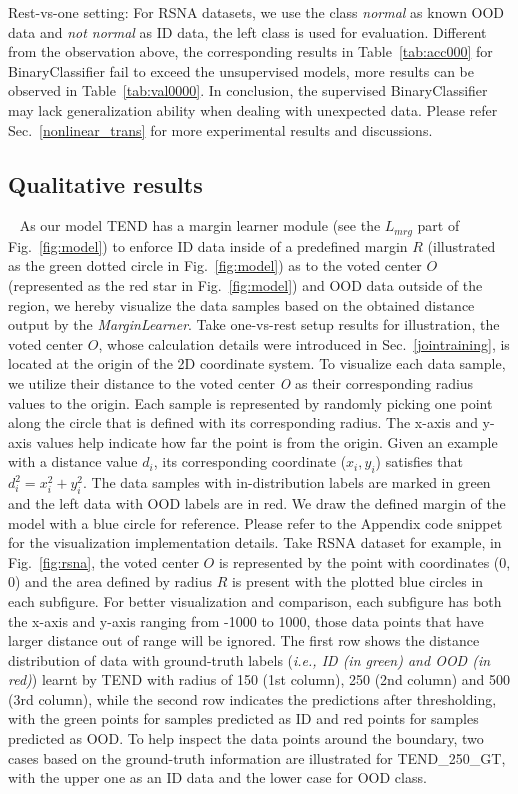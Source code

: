 \documentclass[12pt]{spieman}  %
\begin{document}
\begin{spacing}{2}
Rest-vs-one setting:
For RSNA datasets, we use the class \textit{normal} as known OOD data and \textit{not normal} as ID data, the left class is used for evaluation. Different from the observation above, the corresponding results in Table~\ref{tab:acc000} for BinaryClassifier fail to exceed the unsupervised models, more results can be observed in Table~\ref{tab:val0000}. In conclusion, the supervised BinaryClassifier may lack generalization ability when dealing with unexpected data.
Please refer Sec.~\ref{nonlinear_trans} for more experimental results and discussions.           


\subsection{Qualitative results}~\label{qual}
\noindent As our model TEND has a margin learner module (see the $L_{mrg}$ part of Fig.~\ref{fig:model}) to enforce ID data inside of a predefined margin $R$ (illustrated as the green dotted circle in Fig.~\ref{fig:model}) as to the voted center $O$ (represented as the red star in Fig.~\ref{fig:model}) and OOD data outside of the region, we hereby visualize the data samples based on the obtained distance output by the \textit{MarginLearner}. Take one-vs-rest setup results for illustration, the voted center $O$, whose calculation details were introduced in Sec.~\ref{jointraining}, is located at the origin of the 2D coordinate system. To visualize each data sample, we utilize their distance to the voted center \textit{O} as their corresponding radius values to the origin. Each sample is represented by randomly picking one point along the circle that is defined with its corresponding radius. The x-axis and y-axis values help indicate how far the point is from the origin. Given an example with a distance value $d_{i}$, its corresponding coordinate ($x_{i}, y_{i}$) satisfies that $d_{i}^{2} = x_{i}^{2} + y_{i}^{2}$. The data samples with in-distribution labels are marked in green and the left data with OOD labels are in red. We draw the defined margin of the model with a blue circle for reference. Please refer to the Appendix code snippet for the visualization implementation details. Take RSNA dataset for example, in Fig.~\ref{fig:rsna}, the voted center $O$ is represented by the point with coordinates (0, 0) and the area defined by radius $R$ is present with the plotted blue circles in each subfigure. For better visualization and comparison, each subfigure has both the x-axis and y-axis ranging from -1000 to 1000, those data points that have larger distance out of range will be ignored. The first row shows the distance distribution of data with ground-truth labels (\textit{i.e., ID (in green) and OOD (in red)}) learnt by TEND with radius of 150 (1st column), 250 (2nd column) and 500 (3rd column), while the second row indicates the predictions after thresholding, with the green points for samples predicted as ID and red points for samples predicted as OOD. To help inspect the data points around the boundary, two cases based on the ground-truth information are illustrated for TEND\_250\_GT, with the upper one as an ID data and the lower case for OOD class.

\end{spacing}
\end{document}
